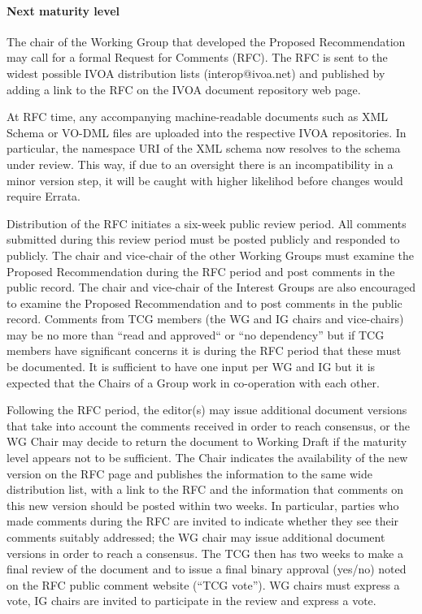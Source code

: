 \documentclass[11pt,a4paper]{ivoa}
\begin{document}
\paragraph{Next maturity level}  The chair of the Working Group that developed the
Proposed Recommendation may call for a formal Request for Comments
(RFC).  The RFC is sent to the widest possible IVOA distribution lists
(interop@ivoa.net) and published by adding a link to the RFC on the IVOA
document repository web page.

At RFC time, any accompanying machine-readable documents such as XML
Schema or VO-DML files are uploaded into the respective IVOA
repositories.  In particular, the namespace URI of the XML schema now
resolves to the schema under review.  This way, if due to an oversight
there is an incompatibility in a minor version step, it will be caught
with higher likelihod before changes would require Errata.

Distribution of the RFC initiates a
six-week public review period.  All comments submitted during this
review period must be posted publicly and responded to publicly.  The
chair and vice-chair of the other Working Groups must examine the
Proposed Recommendation during the RFC period and post comments in the
public record.  The chair and vice-chair of the Interest Groups are also
encouraged to examine the Proposed Recommendation and to post comments
in the public record. Comments from TCG members (the WG and IG chairs
and vice-chairs) may be no more than “read and approved“ or “no
dependency” but if TCG members have significant concerns it is during
the RFC period that these must be documented.  It is sufficient to have
one input per WG and IG but it is expected that the Chairs of a Group
work in co-operation with each other.

Following the RFC period, the editor(s) may issue additional document
versions that take into account the comments received in order to reach
consensus, or the WG Chair may decide to return the document to Working
Draft if the maturity level appears not to be sufficient. The Chair
indicates the availability of the new version on the RFC page and
publishes the information to the same wide distribution list, with a
link to the RFC and the information that comments on this new version
should be posted within two weeks. In particular, parties who made
comments during the RFC are invited to indicate whether they see their
comments suitably addressed; the WG chair may issue additional document
versions in order to reach a consensus. The TCG then has two weeks to
make a final review of the document and to issue a final binary approval
(yes/no) noted on the RFC public comment website (“TCG vote”). WG chairs
must express a vote, IG chairs are invited to participate in the review
and express a vote.
\end{document}
